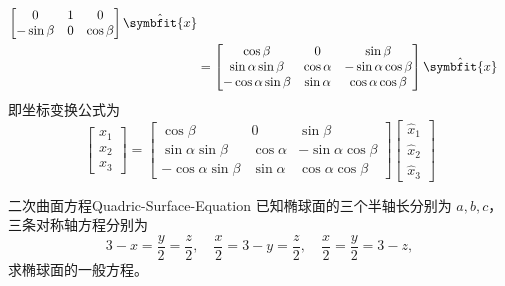 \begin{solution}
\begin{equation}
\begin{aligned}
\begin{bmatrix}
                                              0          & 1 & 0         \\
                                              -\sin\beta & 0 & \cos\beta
                                          \end{bmatrix} \hat{\symbfit{x}}                \\
                        & = \begin{bmatrix}
                                \cos\beta            & 0          & \sin\beta            \\
                                \sin\alpha\sin\beta  & \cos\alpha & -\sin\alpha\cos\beta \\
                                -\cos\alpha\sin\beta & \sin\alpha & \cos\alpha\cos\beta
                            \end{bmatrix} \hat{\symbfit{x}}
        \end{aligned}
    \end{equation}
    即坐标变换公式为
    \begin{equation}
        \boxed{\begin{bmatrix} x_1 \\ x_2 \\ x_3 \end{bmatrix} = \begin{bmatrix} \cos\beta & 0 & \sin\beta \\ \sin\alpha\sin\beta & \cos\alpha & -\sin\alpha\cos\beta \\ -\cos\alpha\sin\beta & \sin\alpha & \cos\alpha\cos\beta \end{bmatrix} \begin{bmatrix} \hat{x}_1 \\ \hat{x}_2 \\ \hat{x}_3 \end{bmatrix}}
    \end{equation}
\end{solution}


\begin{problem}{二次曲面方程}{Quadric-Surface-Equation}
    已知椭球面的三个半轴长分别为 $a,b,c$，三条对称轴方程分别为
    \begin{equation}
        3 - x = \frac{y}{2} = \frac{z}{2}, \quad \frac{x}{2} = 3 - y = \frac{z}{2}, \quad \frac{x}{2} = \frac{y}{2} = 3 - z,
    \end{equation}
    求椭球面的一般方程。
\end{problem}

